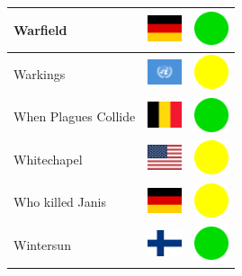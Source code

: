 \documentclass[12pt, a4paper, twoside]{report}
\begin{document}
\begin{center}
\begin{longtable}{|p{5cm}|p{2cm}|p{2cm}|}
			Warfield & \includegraphics[width=1cm]{4x3/de} & \includegraphics[width=1cm]{likes/y} \\ \hline
			Warkings & \includegraphics[width=1cm]{4x3/un} & \includegraphics[width=1cm]{likes/m} \\ \hline
			When Plagues Collide & \includegraphics[width=1cm]{4x3/be} & \includegraphics[width=1cm]{likes/y} \\ \hline
			Whitechapel & \includegraphics[width=1cm]{4x3/us} & \includegraphics[width=1cm]{likes/m} \\ \hline
			Who killed Janis & \includegraphics[width=1cm]{4x3/de} & \includegraphics[width=1cm]{likes/m} \\ \hline
			Wintersun & \includegraphics[width=1cm]{4x3/fi} & \includegraphics[width=1cm]{likes/y} \\ \hline

\end{longtable}
\end{center}
\end{document}
